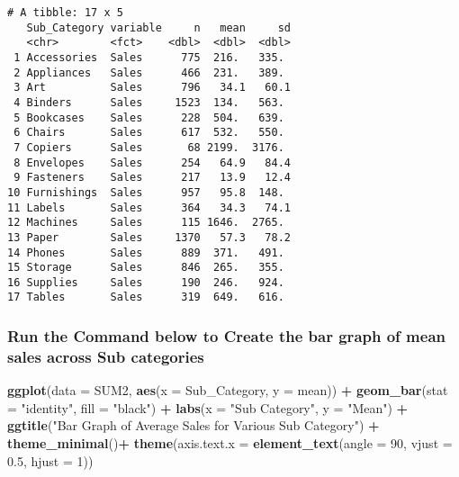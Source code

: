 \documentclass[
]{article}
\newenvironment{Shaded}{\begin{snugshade}}{\end{snugshade}}
\newcommand{\AttributeTok}[1]{\textcolor[rgb]{0.13,0.29,0.53}{#1}}
\newcommand{\DecValTok}[1]{\textcolor[rgb]{0.00,0.00,0.81}{#1}}
\newcommand{\FloatTok}[1]{\textcolor[rgb]{0.00,0.00,0.81}{#1}}
\newcommand{\FunctionTok}[1]{\textcolor[rgb]{0.13,0.29,0.53}{\textbf{#1}}}
\newcommand{\NormalTok}[1]{#1}
\newcommand{\SpecialCharTok}[1]{\textcolor[rgb]{0.81,0.36,0.00}{\textbf{#1}}}
\newcommand{\StringTok}[1]{\textcolor[rgb]{0.31,0.60,0.02}{#1}}
\begin{document}
\begin{verbatim}
# A tibble: 17 x 5
   Sub_Category variable     n   mean     sd
   <chr>        <fct>    <dbl>  <dbl>  <dbl>
 1 Accessories  Sales      775  216.   335. 
 2 Appliances   Sales      466  231.   389. 
 3 Art          Sales      796   34.1   60.1
 4 Binders      Sales     1523  134.   563. 
 5 Bookcases    Sales      228  504.   639. 
 6 Chairs       Sales      617  532.   550. 
 7 Copiers      Sales       68 2199.  3176. 
 8 Envelopes    Sales      254   64.9   84.4
 9 Fasteners    Sales      217   13.9   12.4
10 Furnishings  Sales      957   95.8  148. 
11 Labels       Sales      364   34.3   74.1
12 Machines     Sales      115 1646.  2765. 
13 Paper        Sales     1370   57.3   78.2
14 Phones       Sales      889  371.   491. 
15 Storage      Sales      846  265.   355. 
16 Supplies     Sales      190  246.   924. 
17 Tables       Sales      319  649.   616. 
\end{verbatim}

\hypertarget{run-the-command-below-to-create-the-bar-graph-of-mean-sales-across-sub-categories}{%
\subsubsection{Run the Command below to Create the bar graph of mean
sales across Sub
categories}\label{run-the-command-below-to-create-the-bar-graph-of-mean-sales-across-sub-categories}}

\begin{Shaded}
\begin{Highlighting}[]
\FunctionTok{ggplot}\NormalTok{(}\AttributeTok{data =}\NormalTok{ SUM2, }\FunctionTok{aes}\NormalTok{(}\AttributeTok{x =}\NormalTok{ Sub\_Category, }\AttributeTok{y =}\NormalTok{ mean)) }\SpecialCharTok{+}
  \FunctionTok{geom\_bar}\NormalTok{(}\AttributeTok{stat =} \StringTok{"identity"}\NormalTok{, }\AttributeTok{fill =} \StringTok{"black"}\NormalTok{) }\SpecialCharTok{+}
  \FunctionTok{labs}\NormalTok{(}\AttributeTok{x =} \StringTok{"Sub Category"}\NormalTok{, }\AttributeTok{y =} \StringTok{"Mean"}\NormalTok{) }\SpecialCharTok{+}
  \FunctionTok{ggtitle}\NormalTok{(}\StringTok{"Bar Graph of Average Sales for Various Sub Category"}\NormalTok{) }\SpecialCharTok{+}
  \FunctionTok{theme\_minimal}\NormalTok{()}\SpecialCharTok{+}
    \FunctionTok{theme}\NormalTok{(}\AttributeTok{axis.text.x =} \FunctionTok{element\_text}\NormalTok{(}\AttributeTok{angle =} \DecValTok{90}\NormalTok{, }\AttributeTok{vjust =} \FloatTok{0.5}\NormalTok{, }\AttributeTok{hjust =} \DecValTok{1}\NormalTok{))}
\end{Highlighting}
\end{Shaded}
\end{document}
